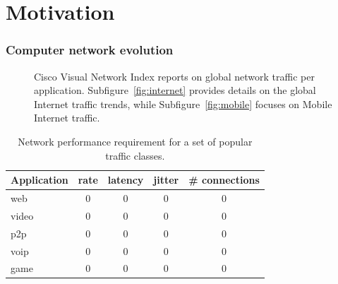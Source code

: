 \section{Motivation} \label{sec:intro:motivations}

\subsubsection*{Computer network evolution}

\begin{figure}[ht] \centering {}
  \caption{Cisco Visual Network Index reports on global network traffic per
    application. Subfigure~\ref{fig:internet} provides details on the global
    Internet traffic trends, while Subfigure~\ref{fig:mobile} focuses on Mobile
    Internet traffic.} \label{fig:internet_applications} \end{figure}


\begin{table} \begin{center} \begin{tabular}{ | l | c c c c | } \hline
      Application  & rate & latency & jitter  & \# connections \\ \hline web
      & 0    & 0       & 0      & 0\\ video        & 0    & 0       & 0      &
      0\\ p2p          & 0    & 0       & 0      & 0\\ voip         & 0    & 0
      & 0      & 0\\ game         & 0    & 0       & 0      & 0\\ \hline
    \end{tabular} \end{center} \caption{Network performance requirement for a
    set of popular traffic classes.} \label{tbl:application_requirement}
\end{table}

